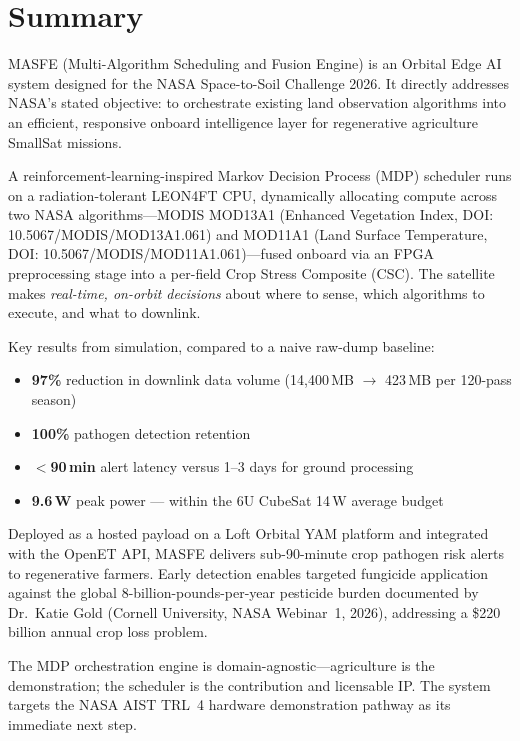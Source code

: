 \chapter*{Summary}

MASFE (Multi-Algorithm Scheduling and Fusion Engine) is an Orbital Edge AI system designed for the NASA Space-to-Soil Challenge 2026. It directly addresses NASA's stated objective: to orchestrate existing land observation algorithms into an efficient, responsive onboard intelligence layer for regenerative agriculture SmallSat missions.

A reinforcement-learning-inspired Markov Decision Process (MDP) scheduler runs on a radiation-tolerant LEON4FT CPU, dynamically allocating compute across two NASA algorithms---MODIS MOD13A1 (Enhanced Vegetation Index, DOI: 10.5067/MODIS/MOD13A1.061) and MOD11A1 (Land Surface Temperature, DOI: 10.5067/MODIS/MOD11A1.061)---fused onboard via an FPGA preprocessing stage into a per-field Crop Stress Composite (CSC). The satellite makes \emph{real-time, on-orbit decisions} about where to sense, which algorithms to execute, and what to downlink.

\medskip
\noindent Key results from simulation, compared to a naive raw-dump baseline:

\begin{itemize}
  \item \textbf{97\%} reduction in downlink data volume (14{,}400\,MB $\rightarrow$ 423\,MB per 120-pass season)
  \item \textbf{100\%} pathogen detection retention
  \item \textbf{$<$90\,min} alert latency versus 1--3 days for ground processing
  \item \textbf{9.6\,W} peak power --- within the 6U CubeSat 14\,W average budget
\end{itemize}

\medskip
\noindent Deployed as a hosted payload on a Loft Orbital YAM platform and integrated with the OpenET API, MASFE delivers sub-90-minute crop pathogen risk alerts to regenerative farmers. Early detection enables targeted fungicide application against the global 8-billion-pounds-per-year pesticide burden documented by Dr.\ Katie Gold (Cornell University, NASA Webinar~1, 2026), addressing a \$220\,billion annual crop loss problem.

The MDP orchestration engine is domain-agnostic---agriculture is the demonstration; the scheduler is the contribution and licensable IP. The system targets the NASA AIST TRL~4 hardware demonstration pathway as its immediate next step.
